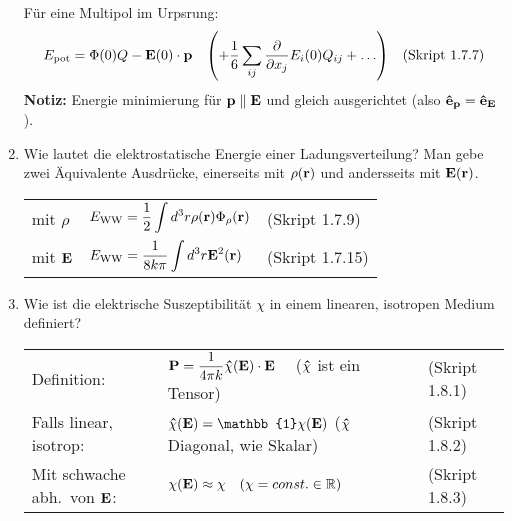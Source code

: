 \documentclass{scrartcl}
\newcommand{\ds}{\displaystyle}
\newcommand{\smref}[1]{\quad\text{(Skript #1)}}
\begin{document}
\begin{enumerate}
          Für eine Multipol im Urpsrung:
          $$E_{\text{pot}}=\Phi(0)Q-\vb E(0)\cdot\vb p 
          \quad\qty(+ \frac{1}{6}\sum_{ij}\pdv{x_j}E_i(0)Q_{ij}+\ldots)
          \smref{1.7.7}$$
          \textbf{Notiz:} Energie minimierung für $\vb p\parallel \vb E$
          und gleich ausgerichtet (also $\vu e_{\vb p}=\vu e_{\vb E}$).\\

    \item Wie lautet die elektrostatische Energie einer Ladungsverteilung?
          Man gebe zwei Äquivalente Ausdrücke, einerseits mit $\rho(\vb r)$
          und andersseits mit $\vb E(\vb r)$.
          \begin{center}
          \begin{tabular}{lll}
            mit $\rho$    & $\ds E_{\text{WW}}=
                            \frac{1}{2}\int d^3 r\rho(\vb r)
                            \Phi_\rho(\vb r)$
                              &(Skript 1.7.9)\\
            mit $\vb E$   & $\ds E_{\text{WW}}=\frac{1}{8k\pi}
                             \int d^3 r\vb E^2(\vb r)$
                              &(Skript 1.7.15)\\
          \end{tabular}
          \end{center}

    \clearpage
    \item Wie ist die elektrische Suszeptibilität $\chi$ in einem 
          linearen, isotropen Medium definiert?
          \begin{center}
          \begin{tabular}{lll}
            Definition:             & $\ds\vb P = \frac{1}{4\pi k} 
                                      \vu \chi(\vb E)\cdot \vb E\quad$
                                      ($\vu\chi$ ist ein Tensor)
                                      & (Skript 1.8.1) \\
            Falls linear, isotrop: 
                                    & $\ds\vu\chi(\vb E)=
                                         \mathbb{1}\chi(\vb E)$
                                      ($\vu\chi$ Diagonal, wie Skalar)
                                      & (Skript 1.8.2) \\
            Mit schwache abh.\ von $\vb E$:
                                    & $\chi(\vb E)\approx\chi
                                    \quad(\chi=const.\in\mathbb{R})$
                                      & (Skript 1.8.3) \\
            

\end{tabular}
\end{center}
\end{enumerate}
\end{document}
